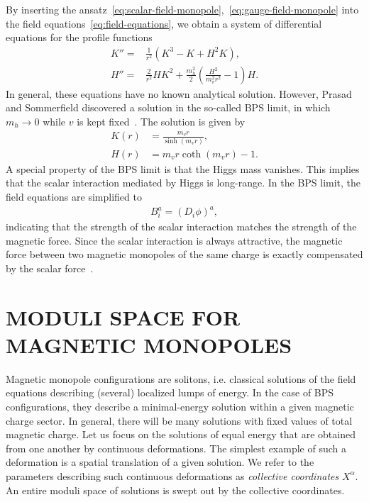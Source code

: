 \documentclass[aps, prd, twocolumn, superscriptaddress, preprintnumbers, nofootinbib, longbibliography]{revtex4-1}
\begin{document}
By inserting the ansatz~\eqref{eq:scalar-field-monopole},~\eqref{eq:gauge-field-monopole} into the field equations~\eqref{eq:field-equations}, we 
obtain a system of differential equations for the profile functions
\begin{align}
  K''=&\frac{1}{r^2}\left(K^3-K+H^2 K\right),\nonumber\\
  H''=&\frac{2}{r^2}H K^2+\frac{m_h^2}{2} \left(\frac{H^2}{m_v^2 r^2}-1\right)H.
\end{align}
In general, these equations have no known analytical solution. However, Prasad and Sommerfield discovered a solution in the so-called BPS limit, in which  $m_h \to 0$ while $v$ is kept  fixed~\cite{Bogomolny:1975de, Prasad-Sommerfield:1975}.
The solution is given by
\begin{align}
\label{eq:BPS-solution}
    K(r)&=\frac{m_v r}{\sinh (m_v r)},\nonumber\\
    H(r)&=m_v r \coth (m_v r)-1.
\end{align}
A special property of the BPS limit is that the Higgs mass vanishes. This implies that the scalar interaction mediated by 
Higgs is long-range. In the BPS limit, the field equations are simplified to
\begin{align}
\label{eq:BPS-equation}
    B_i^a = (D_i \phi)^a,
\end{align}
indicating that the strength of the scalar interaction matches the strength of the magnetic force. Since the scalar interaction is always attractive, the magnetic force between two magnetic monopoles of the same charge is exactly compensated by the scalar force~\cite{Manton:1977er}.\\

\section{\MakeUppercase{Moduli Space for Magnetic Monopoles}}


\label{sec:moduli-space-for-magnetic-monopoles}

Magnetic monopole configurations are solitons, i.e. classical solutions of the field equations describing (several) localized lumps of energy. In the case of BPS configurations, they describe a minimal-energy solution within a given magnetic charge sector. In general, there will be many solutions with fixed values 
of total magnetic charge.  Let us focus on the solutions of equal energy that 
are obtained from one another by continuous deformations. 
The simplest example of such a deformation is a spatial translation of a given solution. We refer to the parameters describing such continuous deformations as \textit{collective coordinates} $X^{\alpha}$. An entire moduli space of solutions is swept out by the collective coordinates. 
\end{document}
